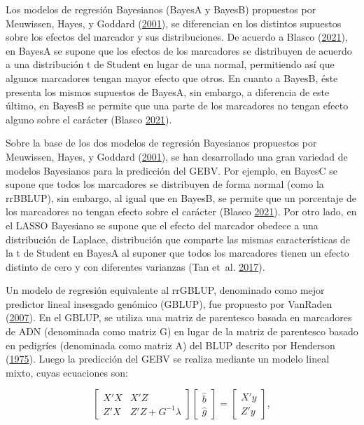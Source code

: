 \documentclass[11pt,spanish,a4paper,oneside,]{book} %
\begin{document}
Los modelos de regresión Bayesianos (BayesA y BayesB) propuestos por Meuwissen, Hayes, y Goddard (\protect\hyperlink{ref-cite:8}{2001}), se diferencian en los distintos supuestos sobre los efectos del marcador y sus distribuciones. De acuerdo a Blasco (\protect\hyperlink{ref-cite:21}{2021}), en BayesA se supone que los efectos de los marcadores se distribuyen de acuerdo a una distribución t de Student en lugar de una normal, permitiendo así que algunos marcadores tengan mayor efecto que otros. En cuanto a BayesB, éste presenta los mismos supuestos de BayesA, sin embargo, a diferencia de este último, en BayesB se permite que una parte de los marcadores no tengan efecto alguno sobre el carácter (Blasco \protect\hyperlink{ref-cite:21}{2021}).

Sobre la base de los dos modelos de regresión Bayesianos propuestos por Meuwissen, Hayes, y Goddard (\protect\hyperlink{ref-cite:8}{2001}), se han desarrollado una gran variedad de modelos Bayesianos para la predicción del GEBV. Por ejemplo, en BayesC se supone que todos los marcadores se distribuyen de forma normal (como la rrBBLUP), sin embargo, al igual que en BayesB, se permite que un porcentaje de los marcadores no tengan efecto sobre el carácter (Blasco \protect\hyperlink{ref-cite:21}{2021}). Por otro lado, en el LASSO Bayesiano se supone que el efecto del marcador obedece a una distribución de Laplace, distribución que comparte las mismas características de la t de Student en BayesA al suponer que todos los marcadores tienen un efecto distinto de cero y con diferentes varianzas (Tan et~al. \protect\hyperlink{ref-cite:34}{2017}).

Un modelo de regresión equivalente al rrGBLUP, denominado como mejor predictor lineal insesgado genómico (GBLUP), fue propuesto por VanRaden (\protect\hyperlink{ref-cite:39}{2007}). En el GBLUP, se utiliza una matriz de parentesco basada en marcadores de ADN (denominada como matriz G) en lugar de la matriz de parentesco basado en pedigríes (denominada como matriz A) del BLUP descrito por Henderson (\protect\hyperlink{ref-cite:41}{1975}). Luego la predicción del GEBV se realiza mediante un modelo lineal mixto, cuyas ecuaciones son:

\begin{equation}
\begin{bmatrix}
X'X & X'Z \\
Z'X & Z'Z + G^{-1} \lambda
\end{bmatrix}
\begin{bmatrix}
\hat{b} \\
\hat{g}
\end{bmatrix}
=
\begin{bmatrix}
X'y \\
Z'y
\end{bmatrix}
,
\end{equation}
\end{document}
